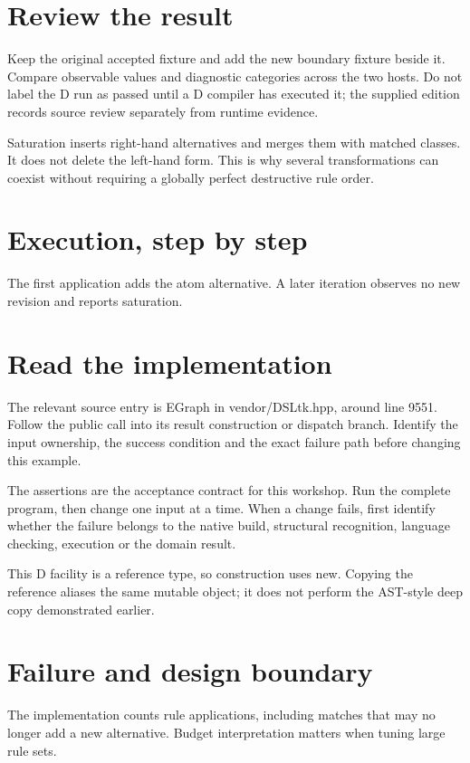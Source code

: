 \section*{Review the result}
Keep the original accepted fixture and add the new boundary fixture beside it. Compare observable values and diagnostic categories across the two hosts. Do not label the D run as passed until a D compiler has executed it; the supplied edition records source review separately from runtime evidence.

\clearpage
{}
Saturation inserts right-hand alternatives and merges them with matched classes. It does not delete the left-hand form. This is why several transformations can coexist without requiring a globally perfect destructive rule order.


\section*{Execution, step by step}
The first application adds the atom alternative. A later iteration observes no new revision and reports saturation.

\section*{Read the implementation}
The relevant source entry is EGraph in vendor/DSLtk.hpp, around line 9551. Follow the public call into its result construction or dispatch branch. Identify the input ownership, the success condition and the exact failure path before changing this example.

The assertions are the acceptance contract for this workshop. Run the complete program, then change one input at a time. When a change fails, first identify whether the failure belongs to the native build, structural recognition, language checking, execution or the domain result.

\clearpage
{}
This D facility is a reference type, so construction uses new. Copying the reference aliases the same mutable object; it does not perform the AST-style deep copy demonstrated earlier.


\section*{Failure and design boundary}
The implementation counts rule applications, including matches that may no longer add a new alternative. Budget interpretation matters when tuning large rule sets.

